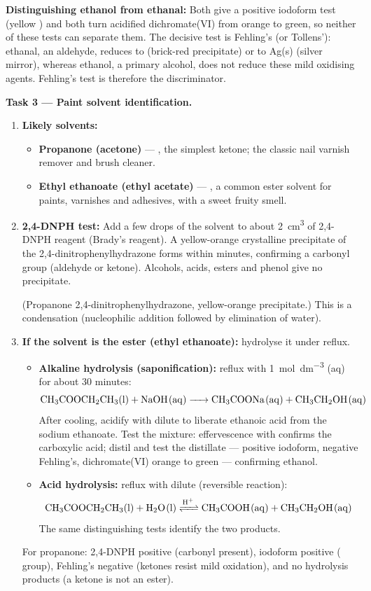 \documentclass[11pt]{article}
\begin{document}
\textbf{Distinguishing ethanol from ethanal:} Both give a positive iodoform test (yellow ) and both turn acidified dichromate(VI) from orange to green, so neither of these tests can separate them. The decisive test is Fehling's (or Tollens'): ethanal, an aldehyde, reduces  to  (brick-red precipitate) or  to Ag(s) (silver mirror), whereas ethanol, a primary alcohol, does not reduce these mild oxidising agents. Fehling's test is therefore the discriminator.

\textbf{Task 3 --- Paint solvent identification.}\par
\begin{enumerate}
    \item \textbf{Likely solvents:}
    \begin{itemize}
        \item \textbf{Propanone (acetone)} --- , the simplest ketone; the classic nail varnish remover and brush cleaner.
        \item \textbf{Ethyl ethanoate (ethyl acetate)} --- , a common ester solvent for paints, varnishes and adhesives, with a sweet fruity smell.
    \end{itemize}
    \item \textbf{2,4-DNPH test:} Add a few drops of the solvent to about \SI{2}{cm^3} of 2,4-DNPH reagent (Brady's reagent). A yellow-orange crystalline precipitate of the 2,4-dinitrophenylhydrazone forms within minutes, confirming a carbonyl group (aldehyde or ketone). Alcohols, acids, esters and phenol give no precipitate.
    \begin{center}
    \end{center}
    (Propanone 2,4-dinitrophenylhydrazone, yellow-orange precipitate.) This is a condensation (nucleophilic addition followed by elimination of water).
    \item \textbf{If the solvent is the ester (ethyl ethanoate):} hydrolyse it under reflux.
    \begin{itemize}
        \item \textbf{Alkaline hydrolysis (saponification):} reflux with \SI{1}{mol.dm^{-3}} (aq) for about 30 minutes:
        \[\ce{CH3COOCH2CH3(l) + NaOH(aq) -> CH3COONa(aq) + CH3CH2OH(aq)}\]
        After cooling, acidify with dilute  to liberate ethanoic acid from the sodium ethanoate. Test the mixture: effervescence with  confirms the carboxylic acid; distil and test the distillate --- positive iodoform, negative Fehling's, dichromate(VI) orange to green --- confirming ethanol.
        \item \textbf{Acid hydrolysis:} reflux with dilute  (reversible reaction):
        \[\ce{CH3COOCH2CH3(l) + H2O(l) <=>[H+] CH3COOH(aq) + CH3CH2OH(aq)}\]
        The same distinguishing tests identify the two products.
    \end{itemize}
    For propanone: 2,4-DNPH positive (carbonyl present), iodoform positive ( group), Fehling's negative (ketones resist mild oxidation), and no hydrolysis products (a ketone is not an ester).
\end{enumerate}
\end{document}
